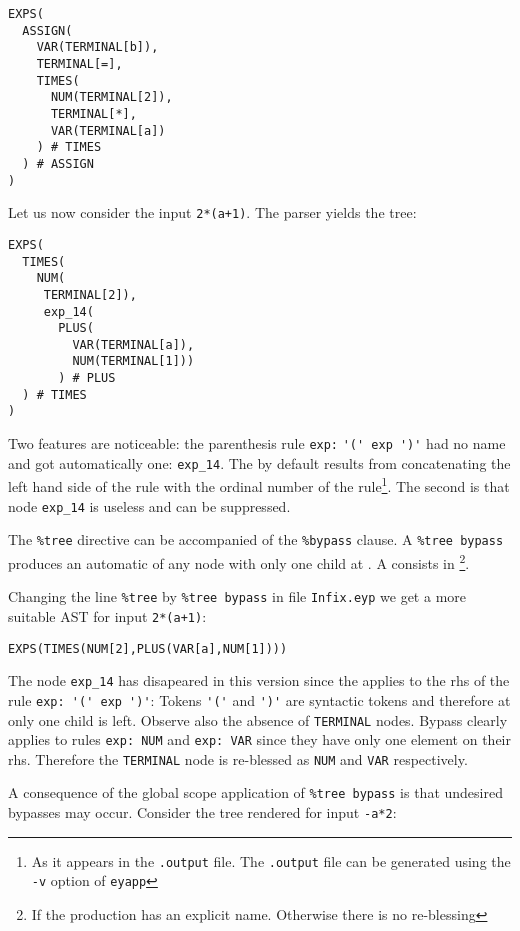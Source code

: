\begin{verbatim}
EXPS(
  ASSIGN(
    VAR(TERMINAL[b]),
    TERMINAL[=],
    TIMES(
      NUM(TERMINAL[2]),
      TERMINAL[*],
      VAR(TERMINAL[a])
    ) # TIMES
  ) # ASSIGN
)
\end{verbatim}
Let us now consider the input \verb|2*(a+1)|.
The parser yields the tree:
\begin{verbatim}
EXPS(
  TIMES(
    NUM(
     TERMINAL[2]),
     exp_14(
       PLUS(
         VAR(TERMINAL[a]),
         NUM(TERMINAL[1]))
       ) # PLUS
  ) # TIMES
)
\end{verbatim}
Two features are noticeable: the parenthesis rule \verb|exp:| \verb|'(' exp ')'|
had no name
and got automatically one: \verb|exp_14|. The  by 
default results from concatenating the left hand side of the rule
with the ordinal number of the rule\footnote{As it appears
in the {\tt .output} file. The {\tt .output} file can be generated 
using the {\tt -v} option of {\tt eyapp}}.
The second is that node \verb|exp_14| is useless and can be suppressed. 

The \verb|%tree| directive can be accompanied of the \verb|%bypass|
clause.  A \verb|%tree bypass| produces an automatic  of any
node with only one child at . 
A  consists in \footnote{If the production has an
explicit name. Otherwise there is no re-blessing}. 

Changing the line \verb|%tree| by \verb|%tree bypass|
in file \verb|Infix.eyp| we get a more suitable 
AST for input \verb|2*(a+1)|:
 
\begin{verbatim}
EXPS(TIMES(NUM[2],PLUS(VAR[a],NUM[1])))
\end{verbatim}

The node \verb|exp_14| has disapeared in this version
since the  applies to the rhs 
of the rule \verb|exp: '(' exp ')'|:
Tokens \verb|'('| and \verb|')'| are syntactic tokens
and therefore at 
only one child is left. Observe also the absence 
of \verb|TERMINAL| nodes. Bypass clearly applies
to rules \verb|exp: NUM| and \verb|exp: VAR| since
they have only one element on their rhs. Therefore the
\verb|TERMINAL| node is re-blessed as \verb|NUM| and
\verb|VAR| respectively.


A consequence of the global scope application of \verb|%tree bypass|
is that undesired bypasses may occur. Consider the tree 
rendered for input \verb|-a*2|:

